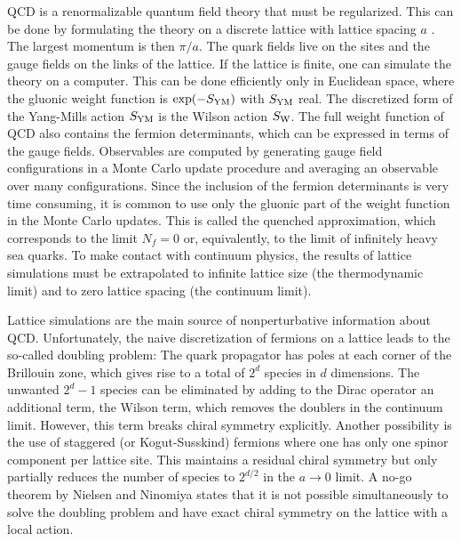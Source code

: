 QCD is a renormalizable quantum field theory that must be regularized.
This can be done by formulating the theory on a discrete lattice with
lattice spacing $a$ \cite{Wils74}.  The largest momentum is then
$\pi/a$.  The quark fields live on the sites and the gauge fields on
the links of the lattice.  If the lattice is finite, one can simulate
the theory on a computer.  This can be done efficiently only in
Euclidean space, where the gluonic weight function is $\exp(-S_{\rm
  YM})$ with $S_{\rm YM}$ real.  The discretized form of the
Yang-Mills action $S_{\rm YM}$ is the Wilson action $S_{\rm W}$.  The
full weight function of QCD also contains the fermion determinants,
which can be expressed in terms of the gauge fields.  Observables are
computed by generating gauge field configurations in a Monte Carlo
update procedure and averaging an observable over many configurations.
Since the inclusion of the fermion determinants is very
time consuming, it is common to use only the gluonic part of the
weight function in the Monte Carlo updates.  This is called the
quenched approximation, which corresponds to the limit $N_f=0$ or,
equivalently, to the limit of infinitely heavy sea quarks.  To make
contact with continuum physics, the results of lattice simulations
must be extrapolated to infinite lattice size (the thermodynamic limit)
and to zero lattice spacing (the continuum limit).

Lattice simulations are the main source of nonperturbative information
about QCD.  Unfortunately, the naive discretization of fermions on a
lattice leads to the so-called doubling problem: The quark propagator
has poles at each corner of the Brillouin zone, which gives rise to a
total of $2^d$ species in $d$ dimensions.  The unwanted $2^d-1$
species can be eliminated by adding to the Dirac operator an
additional term, the Wilson term, which removes the doublers in the
continuum limit.  However, this term breaks chiral symmetry
explicitly.  Another possibility is the use of staggered (or
Kogut-Susskind) fermions where one has only one spinor component per
lattice site.  This maintains a residual chiral symmetry but only
partially reduces the number of species to $2^{d/2}$ in the $a\to0$
limit.  A no-go theorem by Nielsen and Ninomiya \cite{Niel81}
states that it is not possible simultaneously to solve
the doubling problem and have exact chiral symmetry on the lattice
with a local action. 

